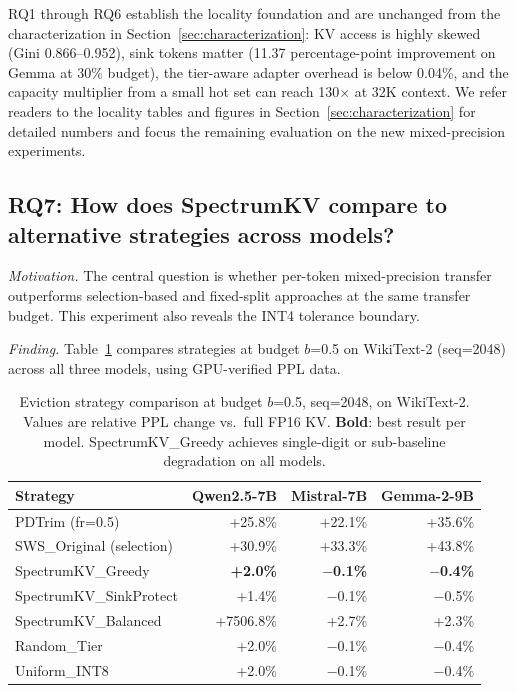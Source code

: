\documentclass[11pt]{article}
\newcommand{\pct}{\%}
\theoremstyle{definition}
\theoremstyle{plain}
\begin{document}
RQ1 through RQ6 establish the locality foundation and are unchanged from the characterization in Section~\ref{sec:characterization}: KV access is highly skewed (Gini 0.866--0.952), sink tokens matter (11.37 percentage-point improvement on Gemma at 30\pct{} budget), the tier-aware adapter overhead is below 0.04\pct{}, and the capacity multiplier from a small hot set can reach 130$\times$ at 32K context.  We refer readers to the locality tables and figures in Section~\ref{sec:characterization} for detailed numbers and focus the remaining evaluation on the new mixed-precision experiments.

\subsection{RQ7: How does SpectrumKV compare to alternative strategies across models?}
\label{sec:rq7}

\emph{Motivation.}  The central question is whether per-token mixed-precision transfer outperforms selection-based and fixed-split approaches at the same transfer budget.  This experiment also reveals the INT4 tolerance boundary.

\emph{Finding.}  Table~\ref{tab:eviction-compare} compares strategies at budget $b$=0.5 on WikiText-2 (seq=2048) across all three models, using GPU-verified PPL data.

\begin{table}[t]
\centering
\caption{Eviction strategy comparison at budget $b$=0.5, seq=2048, on WikiText-2.  Values are relative PPL change vs.\ full FP16 KV.  \textbf{Bold}: best result per model.  SpectrumKV\_Greedy achieves single-digit or sub-baseline degradation on all models.}
\label{tab:eviction-compare}
\small
\begin{tabular}{lrrr}
\toprule
Strategy & Qwen2.5-7B & Mistral-7B & Gemma-2-9B \\
\midrule
PDTrim (fr=0.5) & +25.8\pct{} & +22.1\pct{} & +35.6\pct{} \\
SWS\_Original (selection) & +30.9\pct{} & +33.3\pct{} & +43.8\pct{} \\
\midrule
SpectrumKV\_Greedy & \textbf{+2.0\pct{}} & \textbf{$-$0.1\pct{}} & \textbf{$-$0.4\pct{}} \\
SpectrumKV\_SinkProtect & +1.4\pct{} & $-$0.1\pct{} & $-$0.5\pct{} \\
SpectrumKV\_Balanced & +7506.8\pct{} & +2.7\pct{} & +2.3\pct{} \\
\midrule
Random\_Tier & +2.0\pct{} & $-$0.1\pct{} & $-$0.4\pct{} \\
Uniform\_INT8 & +2.0\pct{} & $-$0.1\pct{} & $-$0.4\pct{} \\
\bottomrule
\end{tabular}
\end{table}
\end{document}
